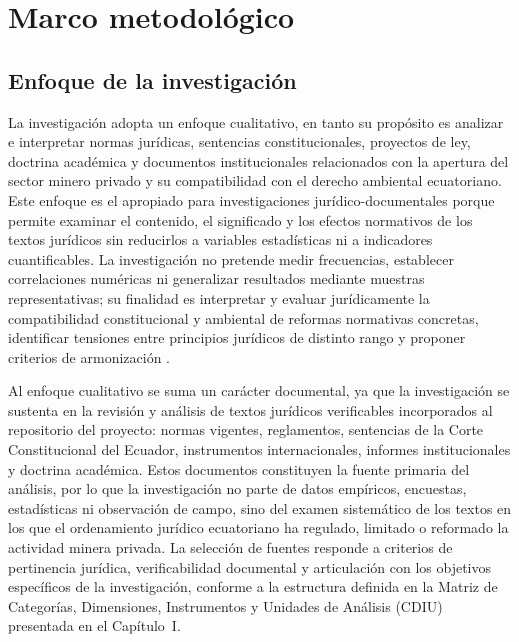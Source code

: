 
\chapter{Marco metodológico}

\section{Enfoque de la investigación}

La investigación adopta un enfoque cualitativo, en tanto su propósito es analizar e interpretar normas jurídicas, sentencias constitucionales, proyectos de ley, doctrina académica y documentos institucionales relacionados con la apertura del sector minero privado y su compatibilidad con el derecho ambiental ecuatoriano. Este enfoque es el apropiado para investigaciones jurídico-documentales porque permite examinar el contenido, el significado y los efectos normativos de los textos jurídicos sin reducirlos a variables estadísticas ni a indicadores cuantificables. La investigación no pretende medir frecuencias, establecer correlaciones numéricas ni generalizar resultados mediante muestras representativas; su finalidad es interpretar y evaluar jurídicamente la compatibilidad constitucional y ambiental de reformas normativas concretas, identificar tensiones entre principios jurídicos de distinto rango y proponer criterios de armonización \parencite{grefa_valencia_2021}.

Al enfoque cualitativo se suma un carácter documental, ya que la investigación se sustenta en la revisión y análisis de textos jurídicos verificables incorporados al repositorio del proyecto: normas vigentes, reglamentos, sentencias de la Corte Constitucional del Ecuador, instrumentos internacionales, informes institucionales y doctrina académica. Estos documentos constituyen la fuente primaria del análisis, por lo que la investigación no parte de datos empíricos, encuestas, estadísticas ni observación de campo, sino del examen sistemático de los textos en los que el ordenamiento jurídico ecuatoriano ha regulado, limitado o reformado la actividad minera privada. La selección de fuentes responde a criterios de pertinencia jurídica, verificabilidad documental y articulación con los objetivos específicos de la investigación, conforme a la estructura definida en la Matriz de Categorías, Dimensiones, Instrumentos y Unidades de Análisis (CDIU) presentada en el Capítulo~I.

